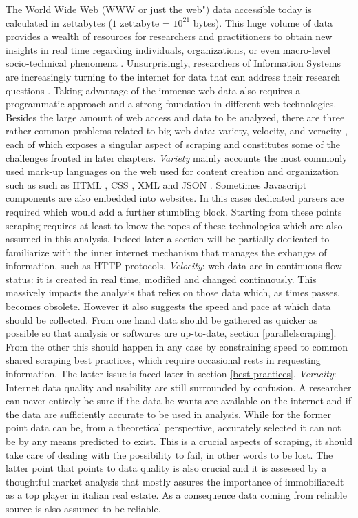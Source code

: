 \documentclass[
  12pt,
  a4paper,
  oneside]{book}
\theoremstyle{definition}
\theoremstyle{definition}
\theoremstyle{definition}
\theoremstyle{remark}
\begin{document}
The World Wide Web (WWW or just the web") data accessible today is calculated in zettabytes \citep{ciscooutlook} (\(1\) zettabyte = \(10^{21}\) bytes). This huge volume of data provides a wealth of resources for researchers and practitioners to obtain new insights in real time regarding individuals, organizations, or even macro-level socio-technical phenomena \citep{krotovtennyson}. Unsurprisingly, researchers of Information Systems are increasingly turning to the internet for data that can address their research questions \citeyearpar{krotovtennyson}. Taking advantage of the immense web data also requires a programmatic approach and a strong foundation in different web technologies.
Besides the large amount of web access and data to be analyzed, there are three rather common problems related to big web data: variety, velocity, and veracity \citep{LegalityEthicsWS}, each of which exposes a singular aspect of scraping and constitutes some of the challenges fronted in later chapters.
\emph{Variety} mainly accounts the most commonly used mark-up languages on the web used for content creation and organization such as such as HTML \citep{html_2020}, CSS \citep{css_2020}, XML \citep{wiki:XML} and JSON \citep{wiki:JSON}. Sometimes Javascript \citep{wiki:Javascript} components are also embedded into websites. In this cases dedicated parsers are required which would add a further stumbling block. Starting from these points scraping requires at least to know the ropes of these technologies which are also assumed in this analysis. Indeed later a section will be partially dedicated to familiarize with the inner internet mechanism that manages the exhanges of information, such as HTTP protocols.
\emph{Velocity}: web data are in continuous flow status: it is created in real time, modified and changed continuously. This massively impacts the analysis that relies on those data which, as times passes, becomes obsolete. However it also suggests the speed and pace at which data should be collected. From one hand data should be gathered as quicker as possible so that analysis or softwares are up-to-date, section \ref{parallelscraping}. From the other this should happen in any case by constraining speed to common shared scraping best practices, which require occasional rests in requesting information. The latter issue is faced later in section \ref{best-practices}.
\emph{Veracity}: Internet data quality and usability are still surrounded by confusion. A researcher can never entirely be sure if the data he wants are available on the internet and if the data are sufficiently accurate to be used in analysis. While for the former point data can be, from a theoretical perspective, accurately selected it can not be by any means predicted to exist. This is a crucial aspects of scraping, it should take care of dealing with the possibility to fail, in other words to be lost. The latter point that points to data quality is also crucial and it is assessed by a thoughtful market analysis that mostly assures the importance of immobiliare.it as a top player in italian real estate. As a consequence data coming from reliable source is also assumed to be reliable.
\end{document}
